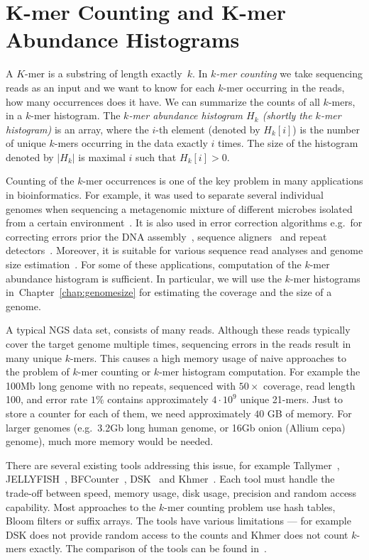 \chapter{K-mer Counting and K-mer Abundance Histograms}

A $K$-mer is a substring of length exactly~$k$. In \emph{$k$-mer counting} we take sequencing reads as an input and we want to know for each $k$-mer occurring in the reads, how many occurrences does it have. We can summarize the counts of all $k$-mers, in a $k$-mer histogram.
The \emph{$k$-mer abundance histogram $H_k$ (shortly the $k$-mer histogram)} is an array, where the $i$-th element (denoted by $H_k[i]$) is the number of unique $k$-mers occurring in the data exactly $i$ times. The size of the histogram denoted by $|H_k|$ is maximal $i$ such that $H_k[i] > 0$.

Counting of the $k$-mer occurrences is one of the key problem in many applications in bioinformatics.
For example, it was used to separate several individual
genomes when sequencing a metagenomic mixture of different microbes isolated from a certain environment~\cite{Wu2011, Wang2012}.
It is also used in error correction algorithms e.g.\ for correcting errors prior the DNA assembly~\cite{Pevzner2001}, sequence aligners~\cite{edgar2004muscle} and repeat detectors~\cite{caponnetto2013efficiency}.
Moreover, it is suitable for various sequence read analyses and genome size estimation~\cite{covest, williams, waterman}.
For some of these applications, computation of the $k$-mer abundance histogram is sufficient.
In particular, we will use the $k$-mer histograms in~Chapter~\ref{chap:genomesize} for estimating the coverage and the size of a genome.

A typical NGS data set, consists of many reads. Although these reads typically cover the target genome multiple times, sequencing errors in the reads result in many unique $k$-mers.
This causes a high memory usage of naive approaches to the problem of $k$-mer counting or $k$-mer histogram computation.
For example the 100Mb long genome with no repeats, sequenced with $50\times$ coverage, read length 100, and error rate $1\%$ contains approximately $4\cdot 10^9$ unique 21-mers. Just to store a counter for each of them, we need approximately $40$ GB of memory. For larger genomes (e.g.\ 3.2Gb long human genome, or 16Gb onion (Allium cepa) genome), much more memory would be needed.

There are several existing tools addressing this issue, for example Tallymer~\cite{tallymer}, JELLYFISH~\cite{jellyfish}, BFCounter~\cite{bfcounter}, DSK~\cite{dsk} and Khmer~\cite{khmer}. Each tool must handle the trade-off between speed, memory usage, disk usage, precision and random access capability. Most approaches to the $k$-mer counting problem use hash tables, Bloom filters or suffix arrays.
The tools have various limitations --- for example DSK does not provide random access to the counts and Khmer does not count $k$-mers exactly.
The comparison of the tools can be found in~\cite{khmer}.

